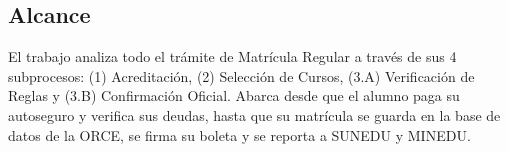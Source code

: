 \subsection{Alcance}

El trabajo analiza todo el trámite de Matrícula Regular a través de sus 4 subprocesos: (1) Acreditación, (2) Selección de Cursos, (3.A) Verificación de Reglas y (3.B) Confirmación Oficial. Abarca desde que el alumno paga su autoseguro y verifica sus deudas, hasta que su matrícula se guarda en la base de datos de la ORCE, se firma su boleta y se reporta a SUNEDU y MINEDU.